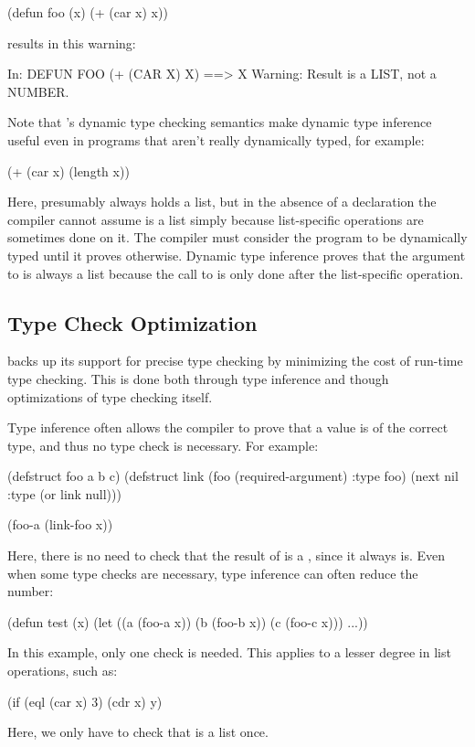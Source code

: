 \begin{lisp}
(defun foo (x)
  (+ (car x) x))
\end{lisp} 

results in this warning:

\begin{example}
In: DEFUN FOO
  (+ (CAR X) X)
==>
  X
Warning: Result is a LIST, not a NUMBER.
\end{example}

Note that \llisp{}'s dynamic type checking semantics make dynamic type
inference useful even in programs that aren't really dynamically
typed, for example:

\begin{lisp}
(+ (car x) (length x))
\end{lisp}

Here,  presumably always holds a list, but in the absence of a
declaration the compiler cannot assume  is a list simply
because list-specific operations are sometimes done on it.  The
compiler must consider the program to be dynamically typed until it
proves otherwise.  Dynamic type inference proves that the argument to
 is always a list because the call to  is
only done after the list-specific  operation.


\subsection{Type Check Optimization}
\label{type-check-optimization}

\python{} backs up its support for precise type checking by minimizing
the cost of run-time type checking.  This is done both through type
inference and though optimizations of type checking itself.

Type inference often allows the compiler to prove that a value is of
the correct type, and thus no type check is necessary.  For example:
\begin{lisp}
(defstruct foo a b c)
(defstruct link
  (foo (required-argument) :type foo)
  (next nil :type (or link null)))

(foo-a (link-foo x))
\end{lisp}

Here, there is no need to check that the result of  is
a , since it always is.  Even when some type checks are
necessary, type inference can often reduce the number:
\begin{example}
(defun test (x)
  (let ((a (foo-a x))
        (b (foo-b x))
        (c (foo-c x)))
    ...))
\end{example}
In this example, only one  check is needed.  This
applies to a lesser degree in list operations, such as:
\begin{lisp}
(if (eql (car x) 3) (cdr x) y)
\end{lisp}
Here, we only have to check that  is a list once.

